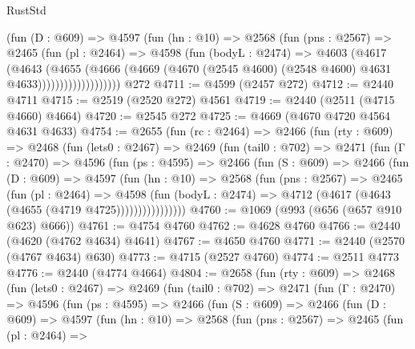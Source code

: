 \begin{lexlean}{RustStd}
\begin{coremodule}
{\begin{coremodule}
{{{{{{{{{{{{                    (fun (D : @609) =>
                    @4597
                      (fun (hn : @10) =>
                      @2568
                        (fun (pns : @2567) =>
                        @2465
                          (fun (pl : @2464) =>
                          @4598
                            (fun (bodyL : @2474) =>
                            @4603
                              (@4617
                                (@4643
                                  (@4655
                                    (@4666
                                      (@4669
                                        (@4670
                                          (@2545 @4600)
                                          (@2548 @4600)
                                          @4631
                                          @4633)))))))))))))))))))
    @272
@4711 := @4599 (@2457 @272)
@4712 := @2440 @4711
@4715 := @2519 (@2520 @272) @4561
@4719 := @2440 (@2511 (@4715 @4660) @4664)
@4720 := @2545 @272
@4725 := @4669 (@4670 @4720 @4564 @4631 @4633)
@4754 := @2655
    (fun (rc : @2464) =>
    @2466
      (fun (rty : @609) =>
      @2468
        (fun (lets0 : @2467) =>
        @2469
          (fun (tail0 : @702) =>
          @2471
            (fun (Γ : @2470) =>
            @4596
              (fun (ps : @4595) =>
              @2466
                (fun (S : @609) =>
                @2466
                  (fun (D : @609) =>
                  @4597
                    (fun (hn : @10) =>
                    @2568
                      (fun (pns : @2567) =>
                      @2465
                        (fun (pl : @2464) =>
                        @4598
                          (fun (bodyL : @2474) =>
                          @4712 (@4617 (@4643 (@4655 (@4719 @4725))))))))))))))))
@4760 := @1069 (@993 (@656 (@657 @910 @623) @666))
@4761 := @4754 @4760
@4762 := @4628 @4760
@4766 := @2440 (@4620 (@4762 @4634) @4641)
@4767 := @4650 @4760
@4771 := @2440 (@2570 (@4767 @4634) @630)
@4773 := @4715 (@2527 @4760)
@4774 := @2511 @4773
@4776 := @2440 (@4774 @4664)
@4804 := @2658
    (fun (rty : @609) =>
    @2468
      (fun (lets0 : @2467) =>
      @2469
        (fun (tail0 : @702) =>
        @2471
          (fun (Γ : @2470) =>
          @4596
            (fun (ps : @4595) =>
            @2466
              (fun (S : @609) =>
              @2466
                (fun (D : @609) =>
                @4597
                  (fun (hn : @10) =>
                  @2568
                    (fun (pns : @2567) =>
                    @2465
                      (fun (pl : @2464) =>
}}}}}}}}}}}}
\end{coremodule}}
\end{coremodule}
\end{lexlean}
